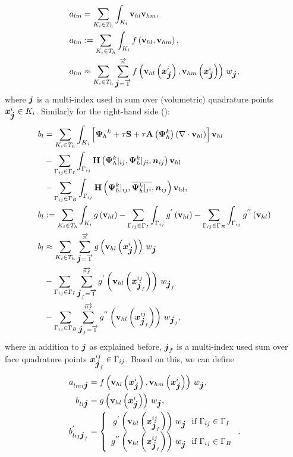 \begin{align}
a_{lm} & =  \sum_{K_i \in T_h}\int_{K_i} \mathrm{\mathbf{v}}_{hl} \mathrm{\mathbf{v}}_{hm}, \\
a_{lm} & := \sum_{K_i \in T_h}\int_{K_i} f\left(\mathrm{\mathbf{v}}_{hl}, \mathrm{\mathbf{v}}_{hm}\right) , \\
a_{lm} & \approx \sum_{K_i \in T_h} \sum_{\mbox{\boldmath $j$}=\overrightarrow{1}}^{\overrightarrow{n}} f\left(\mathrm{\mathbf{v}}_{hl}\left(\mbox{\boldmath $x$}_{\mbox{\boldmath $j$}}^i\right), \mathrm{\mathbf{v}}_{hm}\left(\mbox{\boldmath $x$}_{\mbox{\boldmath $j$}}^i\right)\right)\,w_{\mbox{\boldmath $j$}},\label{Final_Integration_Fn}
\end{align}
where $\mbox{\boldmath $j$}$ is a multi-index used in sum over (volumetric) quadrature points $\mbox{\boldmath $x$}_{\mbox{\boldmath $j$}}^i \in K_i$.
Similarly for the right-hand side ():
\begin{align}
b_{l} & =  \sum_{K_i \in T_h}\int_{K_i} \left[{\mathrm{\mathbf{\Psi}}_h}^{k} + \tau\mathrm{\mathbf{S}} + \tau\mathrm{\mathbf{A}}\left({\mathrm{\mathbf{\Psi}}_h^{k}}\right) \left(\nabla \cdot \mathrm{\mathbf{v}}_{hl}\right)\right] \mathrm{\mathbf{v}}_{hl}\\
\nonumber & - \sum_{\Gamma_{ij}\in\Gamma_I} \int_{\Gamma_{ij}}\mathrm{\mathbf{H}}\left({\mathrm{\mathbf{\Psi}}_h^{k}}|_{ij}, {\mathrm{\mathbf{\Psi}}_h^{k}}|_{ji}, \mbox{\boldmath $n$}_{ij}\right) \mathrm{\mathbf{v}}_{hl}\\
\nonumber& - \sum_{\Gamma_{ij}\in\Gamma_B} \int_{\Gamma_{ij}} \mathrm{\mathbf{H}}\left({\mathrm{\mathbf{\Psi}}_h^{k}}|_{ij}, \overline{{\mathrm{\mathbf{\Psi}}_h^{k}}|_{ji}}, \mbox{\boldmath $n$}_{ij}\right) \mathrm{\mathbf{v}}_{hl},\\
\label{Final_Integration_Fn_b}   b_{l} & := \sum_{K_i \in T_h}\int_{K_i} g\left(\mathrm{\mathbf{v}}_{hl}\right) - \sum_{\Gamma_{ij}\in\Gamma_I} \int_{\Gamma_{ij}}g^{'}\left(\mathrm{\mathbf{v}}_{hl}\right) - \sum_{\Gamma_{ij}\in\Gamma_B} \int_{\Gamma_{ij}} g^{''}\left(\mathrm{\mathbf{v}}_{hl}\right) \\
b_{l} & \approx \sum_{K_i \in T_h} \sum_{\mbox{\boldmath $j$}=\overrightarrow{1}}^{\overrightarrow{n}} g\left(\mathrm{\mathbf{v}}_{hl}\left(\mbox{\boldmath $x$}_{\mbox{\boldmath $j$}}^i\right)\right)\,w_{\mbox{\boldmath $j$}}\\
\nonumber & -  \sum_{\Gamma_{ij}\in\Gamma_I} \sum_{\mbox{\boldmath $j$}_f=\overrightarrow{1}}^{\overrightarrow{n_f}} g^{'}\left(\mathrm{\mathbf{v}}_{hl}\left(\mbox{\boldmath $x$}^{ij}_{\mbox{\boldmath $j$}_{f}}\right)\right)\,w_{\mbox{\boldmath $j$}_{f}}\\
\nonumber & -  \sum_{\Gamma_{ij}\in\Gamma_B} \sum_{\mbox{\boldmath $j$}_{f}=\overrightarrow{1}}^{\overrightarrow{n_f}} g^{''}\left(\mathrm{\mathbf{v}}_{hl}\left(\mbox{\boldmath $x$}^{ij}_{\mbox{\boldmath $j$}_{f}}\right)\right)\,w_{\mbox{\boldmath $j$}_{f}},
\end{align}
where in addition to $\mbox{\boldmath $j$}$ as explained before, $\mbox{\boldmath $j$}_{f}$ is a multi-index used sum over face quadrature points $\mbox{\boldmath $x$}_{\mbox{\boldmath $j$}_f}^{ij} \in \Gamma_{ij}$. Based on this, we can define
\begin{align}
	\label{singleNumIntA}   a_{lmi \bfj} & =  f\lo\mrvhl\lo\bfx^i_{\bfj}\ro, \mrvhm\lo\bfx^i_{\bfj}\ro\ro\,w_{\bfj},\\
	\label{singleNumIntB}   b_{li \bfj} & =  g\lo\mrvhl\lo\bfx^i_{\bfj}\ro\ro\,w_{\bfj},\\
	\label{singleNumIntBface}  b^{'}_{lij \bfj_f} & =  \left\{\begin{array}{c} g^{'}\lo\mrvhl\lo\bfx^{ij}_{\bfj_f}\ro\ro\,w_{\bfj}\ \ \text{if}\ \Gamma_{ij}\in \Gamma_I \\ g^{''}\lo\mrvhl\lo\bfx^{ij}_{\bfj_f}\ro\ro\,w_{\bfj}\ \ \text{if}\ \Gamma_{ij}\in \Gamma_B \end{array}\right. .
\end{align}

